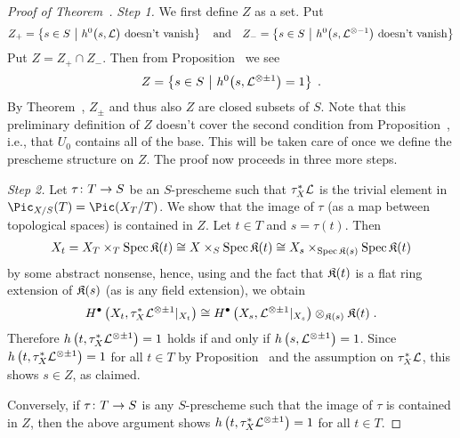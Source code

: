\documentclass[a4paper,parskip=half,numbers=enddot, DIV=12]{scrreprt}
\begin{document}
\begin{proof}[Proof of Theorem~]
	\emph{Step 1.} We first define $Z$ as a set. Put
	\begin{align*}
		Z_+=\left\{s\in S\ \middle|\  h^0\big(s,\mathcal{L}\big)\text{ doesn't vanish}\right\}\quad\text{and}\quad Z_-=\left\{s\in S\ \middle|\  h^0\big(s,\mathcal{L}^{\otimes -1}\big)\text{ doesn't vanish}\right\}
	\end{align*}
	Put $Z=Z_+\cap Z_-$. Then from 
	Proposition~ we see 
	\begin{align*}
		Z=\left\{s\in S\ \middle|\  h^0\big(s,\mathcal{L}^{\otimes \pm 1}\big)=1\right\}\;.
	\end{align*}
	By Theorem~, $Z_\pm$ and thus also $Z$ are closed subsets of $S$. Note that this preliminary definition of $Z$ doesn't cover the second condition from Proposition~, i.e., that $U_0$ contains all of the base. This will be taken care of once we define the prescheme structure on $Z$. The proof now proceeds in three more steps.
	
	 \emph{Step 2.} Let $\tau\colon T\morphism S$ be an $S$-prescheme such that $\tau_X^*\mathcal{L}$ is the trivial element in $\Pic_{X/S}(T)=\Pic(X_T/T)$. We show that the image of $\tau$ (as a map between topological spaces) is contained in $Z$.  Let $t\in T$ and $s=\tau(t)$. Then
	\begin{align*}
		X_t=X_T\times_T\operatorname{Spec}\mathfrak{K}(t)\cong X\times_S\operatorname{Spec}\mathfrak{K}(t)\cong X_s\times_{\operatorname{Spec}\mathfrak{K}(s)}\operatorname{Spec}\mathfrak{K}(t)
	\end{align*}
	by some abstract nonsense, hence, using  and the fact that $\mathfrak{K}(t)$ is a flat ring extension of $\mathfrak{K}(s)$ (as is any field extension), we obtain
	\begin{align*}
		H^\bullet\left(X_t,\tau_X^*\mathcal{L}^{\otimes \pm 1}|_{X_t}\right)\cong H^\bullet\left(X_s,\mathcal{L}^{\otimes \pm 1}|_{X_s}\right)\otimes_{\mathfrak{K}(s)}\mathfrak{K}(t)\;.
	\end{align*}
	 Therefore $h\left(t,\tau_X^*\mathcal{L}^{\otimes \pm 1}\right)=1$ holds if and only if $h\left(s,\mathcal{L}^{\otimes \pm 1}\right)=1$. Since $h\left(t,\tau_X^*\mathcal{L}^{\otimes \pm 1}\right)=1$ for all $t\in T$ by Proposition~ and the assumption on $\tau_X^*\mathcal{L}$, this shows $s\in Z$, as claimed.
	
	Conversely, if $\tau\colon T\morphism S$ is any $S$-prescheme such that the image of  $\tau$ is contained in $Z$, then the above argument shows $h\left(t,\tau_X^*\mathcal{L}^{\otimes \pm 1}\right)=1$ for all $t\in T$.
	

\end{proof}
\end{document}
